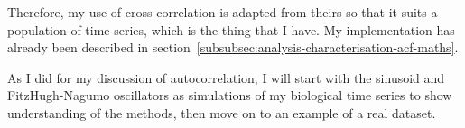 Therefore, my use of cross-correlation is adapted from theirs so that it suits a population of time series, which is the thing that I have.
My implementation has already been described in section~\ref{subsubsec:analysis-characterisation-acf-maths}.

As I did for my discussion of autocorrelation, I will start with the sinusoid and FitzHugh-Nagumo oscillators as simulations of my biological time series to show understanding of the methods,
then move on to an example of a real dataset.




